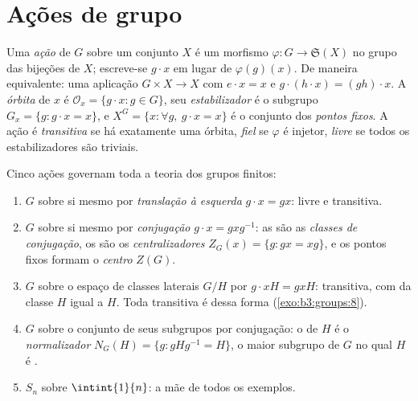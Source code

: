 \section{Ações de grupo}

\begin{definition}\label{def:b3:groups:action}
Uma \emph{ação} de $G$ sobre um conjunto
$X$ é um morfismo $\varphi \colon G \to \mathfrak{S}(X)$ no grupo das bijeções de $X$;
escreve-se $g \cdot x$ em lugar de $\varphi(g)(x)$. De maneira equivalente: uma
aplicação $G \times X \to X$ com $e \cdot x = x$ e $g
\cdot (h \cdot x) = (gh) \cdot x$. A \emph{órbita} de
$x$ é $\mathcal O_x = \{g \cdot x : g \in G\}$, seu \emph{estabilizador} é o
subgrupo $G_x = \{g :
g\cdot x = x\}$, e $X^G = \{x : \forall g,\ g \cdot x = x\}$ é o conjunto dos \emph{pontos fixos}. A ação é
\emph{transitiva} se há exatamente uma órbita, \emph{fiel} se $\varphi$ é
injetor, \emph{livre} se todos os estabilizadores são triviais.
\end{definition}

\begin{example}\label{ex:b3:groups:actions}
Cinco ações governam toda a teoria dos grupos finitos:
\begin{enumerate}
  \item $G$ sobre si mesmo por \emph{translação à esquerda} $g \cdot x = gx$:
        livre e transitiva.
  \item $G$ sobre si mesmo por \emph{conjugação} $g \cdot x = gxg^{-1}$: as 
        são as \emph{classes de conjugação}, os  são os
        \emph{centralizadores} $Z_G(x) = \{g : gx = xg\}$, e os pontos
        fixos formam o \emph{centro} $Z(G)$.
  \item $G$ sobre o espaço de classes laterais $G/H$ por $g \cdot xH = gxH$:
        transitiva, com  da classe $H$ igual a
        $H$. Toda  transitiva é dessa forma
        (\cref{exo:b3:groups:8}).
  \item $G$ sobre o conjunto de seus subgrupos por conjugação: o
         de $H$ é o \emph{normalizador}
        $N_G(H) =
        \{g : gHg^{-1} = H\}$, o maior subgrupo de $G$ no qual $H$ é .
  \item $S_n$ sobre $\intint{1}{n}$: a mãe de todos os exemplos.
\end{enumerate}
\end{example}

